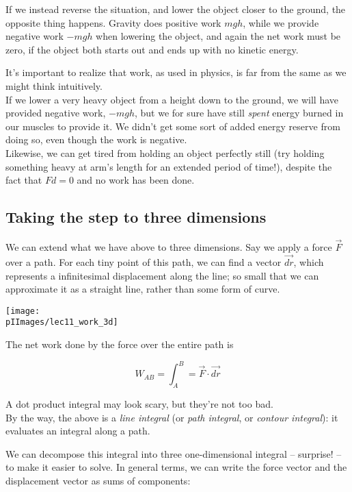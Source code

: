 If we instead reverse the situation, and lower the object closer to the ground, the opposite thing happens. Gravity does positive work $m g h$, while we provide negative work $- m g h$ when lowering the object, and again the net work must be zero, if the object both starts out and ends up with no kinetic energy.

It's important to realize that work, as used in physics, is far from the same as we might think intuitively.\\
If we lower a very heavy object from a height down to the ground, we will have provided negative work, $- m g h$, but we for sure have still \emph{spent} energy burned in our muscles to provide it. We didn't get some sort of added energy reserve from doing so, even though the work is negative.\\
Likewise, we can get tired from holding an object perfectly still (try holding something heavy at arm's length for an extended period of time!), despite the fact that $F d = 0$ and no work has been done.

\subsection{Taking the step to three dimensions}

We can extend what we have above to three dimensions. Say we apply a force $\vec{F}$ over a path. For each tiny point of this path, we can find a vector $\vec{dr}$, which represents a infinitesimal displacement along the line; so small that we can approximate it as a straight line, rather than some form of curve.

\begin{center}
\texttt{[image: \\pIImages/lec11\_work\_3d]}
\end{center}

The net work done by the force over the entire path is

\begin{equation}
W_{AB} = \int_A^B = \vec{F} \cdot \vec{dr}
\end{equation}

A dot product integral may look scary, but they're not too bad.\\
By the way, the above is a \emph{line integral} (or \emph{path integral}, or \emph{contour integral}): it evaluates an integral along a path.

We can decompose this integral into three one-dimensional integral -- surprise! -- to make it easier to solve. In general terms, we can write the force vector and the displacement vector as sums of components:

